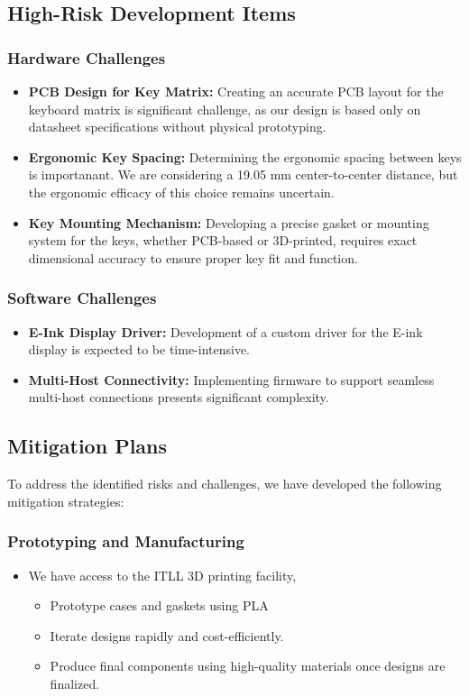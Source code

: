 \documentclass[a4paper,11pt]{article}%
\begin{document}
\subsection{High-Risk Development Items}
\subsubsection{Hardware Challenges}
\begin{itemize}
    \item \textbf{PCB Design for Key Matrix:} Creating an accurate PCB layout for the keyboard matrix is significant challenge, as our design is based only on datasheet specifications without physical prototyping.
    
    \item \textbf{Ergonomic Key Spacing:} Determining the ergonomic spacing between keys is importanant. We are considering a 19.05 mm center-to-center distance, but the ergonomic efficacy of this choice remains uncertain.
    
    \item \textbf{Key Mounting Mechanism:} Developing a precise gasket or mounting system for the keys, whether PCB-based or 3D-printed, requires exact dimensional accuracy to ensure proper key fit and function.
\end{itemize}

\subsubsection{Software Challenges}
\begin{itemize}
    \item \textbf{E-Ink Display Driver:} Development of a custom driver for the E-ink display is expected to be time-intensive.
    
    \item \textbf{Multi-Host Connectivity:} Implementing firmware to support seamless multi-host connections presents significant complexity.
\end{itemize}


\subsection{Mitigation Plans}
To address the identified risks and challenges, we have developed the following mitigation strategies:

\subsubsection{Prototyping and Manufacturing}
\begin{itemize}
    \item We have access to the ITLL 3D printing facility,
    \begin{itemize}
        \item Prototype cases and gaskets using PLA
        \item Iterate designs rapidly and cost-efficiently.
        \item Produce final components using high-quality materials once designs are finalized.
    \end{itemize}
\end{itemize}
\end{document}
